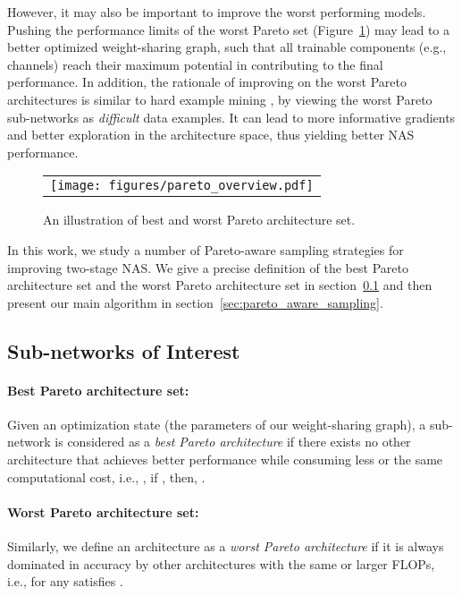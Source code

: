 \documentclass[final]{cvpr}
\theoremstyle{definition}
\begin{document}
However, it may also be important to improve the worst performing models. 
Pushing the performance limits of the worst {Pareto} set (Figure~\ref{fig:pareto_set}) may lead to a better optimized weight-sharing graph, such that all trainable components (e.g., channels) 
reach their maximum potential in contributing to the final performance. 
In addition, the rationale of improving on the  worst Pareto architectures is similar to hard example mining \cite{shrivastava2016training, smirnov2018hard, suh2019stochastic, jin2018unsupervised}, by viewing the worst {Pareto} sub-networks as \emph{difficult} data examples. 
It can lead to more informative gradients and better exploration in the architecture space, 
thus yielding better NAS performance.

\begin{figure}[t]
\centering
\begin{tabular}{c}
\texttt{[image: figures/pareto\_overview.pdf]}\\
\end{tabular}
\caption{ An illustration of best and worst Pareto architecture set. }
\label{fig:pareto_set}
\end{figure}

In this work, we study a number of Pareto-aware sampling strategies for improving 
two-stage NAS. We give a precise definition of the best {Pareto} architecture set and the worst {Pareto} architecture set in section~\ref{sec:pareto_set} 
and then present our main algorithm in section~\ref{sec:pareto_aware_sampling}. 

\subsection{Sub-networks of Interest}
\label{sec:pareto_set}

\paragraph{Best Pareto architecture set:}
Given an optimization state  (the parameters of our weight-sharing graph), 
a sub-network  is considered as a \emph{best Pareto architecture} if there exists no other architecture  that achieves better performance while consuming less or the same computational cost,  
i.e., , if , then, .


\paragraph{Worst Pareto architecture set:}
Similarly, we define an architecture  as a \emph{worst Pareto architecture} if it is always dominated in accuracy by other architectures with the same or larger FLOPs, i.e., 
 for any  satisfies .
\end{document}
